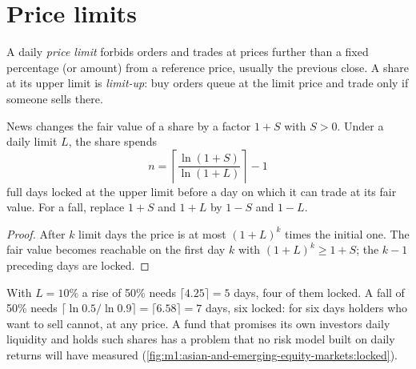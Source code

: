 \section{Price limits}

\begin{definition}\label{def:m1:asian-and-emerging-equity-markets:limit}
A daily \emph{price limit} forbids orders and trades at
prices further than a fixed percentage (or amount) from a reference price,
usually the previous close. A share at its upper limit is \emph{limit-up}:
buy orders queue at the limit price and trade only if someone sells there.
\end{definition}

\begin{proposition}\label{prop:m1:asian-and-emerging-equity-markets:locked}
News changes the fair value of a share by a factor $1+S$ with $S>0$. Under a
daily limit $L$, the share spends
\[
n = \left\lceil \frac{\ln(1+S)}{\ln(1+L)} \right\rceil - 1
\]
full days locked at the upper limit before a day on which it can trade at its
fair value. For a fall, replace $1+S$ and $1+L$ by $1-S$ and $1-L$.
\end{proposition}
\begin{proof}
After $k$ limit days the price is at most $(1+L)^k$ times the initial one.
The fair value becomes reachable on the first day $k$ with $(1+L)^k \ge 1+S$;
the $k-1$ preceding days are locked.
\end{proof}

\begin{example}\label{ex:m1:asian-and-emerging-equity-markets:asym}
With $L = 10\%$ a rise of 50\% needs $\lceil 4.25\rceil = 5$ days, four of
them locked. A fall of 50\% needs $\lceil \ln 0.5/\ln 0.9\rceil = \lceil
6.58\rceil = 7$ days, six locked: for six days holders who want to sell
cannot, at any price. A fund that promises its own investors daily liquidity
and holds such shares has a problem that no risk model built on daily
returns will have measured (\cref{fig:m1:asian-and-emerging-equity-markets:locked}).
\end{example}

